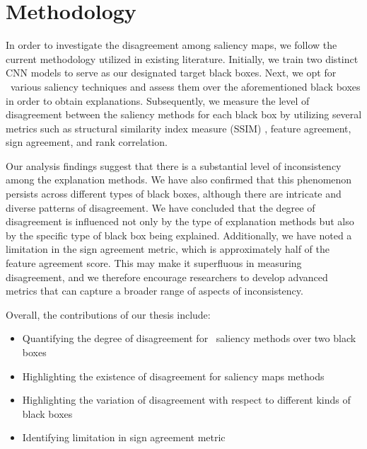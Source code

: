 \section{Methodology}
\label{sec:methodology}

In order to investigate the disagreement among saliency maps, we follow the current methodology utilized in existing literature. Initially, we train two distinct CNN models to serve as our designated target black boxes. Next, we opt for \numExperimentedMethods\ various saliency techniques and assess them over the aforementioned black boxes in order to obtain explanations. Subsequently, we measure the level of disagreement between the saliency methods for each black box by utilizing several metrics such as structural similarity index measure (SSIM) \cite{ssim}, feature agreement, sign agreement, and rank correlation.

Our analysis findings suggest that there is a substantial level of inconsistency among the explanation methods. We have also confirmed that this phenomenon persists across different types of black boxes, although there are intricate and diverse patterns of disagreement. We have concluded that the degree of disagreement is influenced not only by the type of explanation methods but also by the specific type of black box being explained. Additionally, we have noted a limitation in the sign agreement metric, which is approximately half of the feature agreement score. This may make it superfluous in measuring disagreement, and we therefore encourage researchers to develop advanced metrics that can capture a broader range of aspects of inconsistency.

Overall, the contributions of our thesis include:
\begin{itemize}
    \item Quantifying the degree of disagreement for \numExperimentedMethods\ saliency methods over two black boxes
    \item Highlighting the existence of disagreement for saliency maps methods
    \item Highlighting the variation of disagreement with respect to different kinds of black boxes
    \item Identifying limitation in sign agreement metric
\end{itemize}

